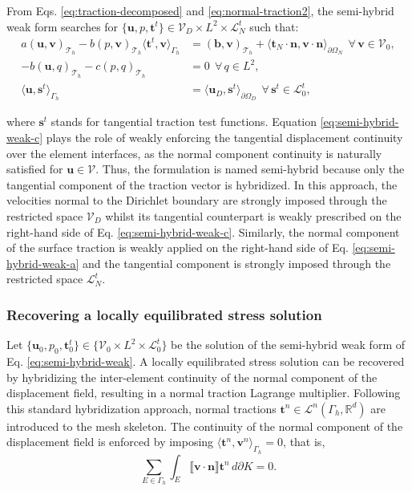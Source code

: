 \documentclass[english,11pt,3p,number,sort&compress]{elsarticle}
\newcommand{\jump}[1]
{
	\llbracket #1 \rrbracket
}
\begin{document}
From Eqs. \eqref{eq:traction-decomposed} and \eqref{eq:normal-traction2}, the semi-hybrid weak form searches for $\{\bm{u},p,\bm{t}^t\} \in \mathcal{V}_D \times L^2 \times \mathcal{L}^t_N$ such that:
\begin{subequations} \label{eq:semi-hybrid-weak}
	\begin{align}
		a\left(\bm{u},\bm{v}\right)_{\mathcal{T}_h} - b\left( p, \bm{v}\right)_{\mathcal{T}_h} \langle\bm{t}^t,\bm{v}\rangle_{\Gamma_h} &= \left(\bm{b},\bm{v}\right)_{\mathcal{T}_h} + \langle\bm{t}_N\cdot\bm{n},\bm{v}\cdot\bm{n}\rangle_{\partial\Omega_N} ~~\forall\, \bm{v} \in \mathcal{V}_0,\label{eq:semi-hybrid-weak-a}\\ 
		-b\left(\bm{u}, q\right)_{\mathcal{T}_h} - c\left(p,q \right)_{\mathcal{T}_h} &= 0 ~~\forall\, q \in L^2, \label{eq:semi-hybrid-weak-b}\\
		\langle\bm{u},\bm{s}^t\rangle_{\Gamma_h} &= \langle\bm{u}_D,\bm{s}^t\rangle_{\partial\Omega_D} ~~\forall\, \bm{s}^t \in \mathcal{L}^t_0, \label{eq:semi-hybrid-weak-c}
	\end{align}
\end{subequations}

\noindent where $\bm{s}^t$ stands for tangential traction test functions. Equation \eqref{eq:semi-hybrid-weak-c} plays the role of weakly enforcing the tangential displacement continuity over the element interfaces, as the normal component continuity is naturally satisfied for $\bm{u} \in \mathcal{V}$. Thus, the formulation is named semi-hybrid because only the tangential component of the traction vector is hybridized. In this approach, the velocities normal to the Dirichlet boundary are strongly imposed through the restricted space $\mathcal{V}_D$ whilst its tangential counterpart is weakly prescribed on the right-hand side of Eq. \eqref{eq:semi-hybrid-weak-c}. Similarly, the normal component of the surface traction is weakly applied on the right-hand side of Eq. \eqref{eq:semi-hybrid-weak-a} and the tangential component is strongly imposed through the restricted space $\mathcal{L}^t_N$.

\subsubsection{Recovering a locally equilibrated stress solution} \label{sec:local-stress}

Let $\{\bm{u}_0,p_0,\bm{t}^t_0 \} \in \{\mathcal{V}_0 \times L^2 \times \mathcal{L}^t_0 \}$ be the solution of the semi-hybrid weak form of Eq. \eqref{eq:semi-hybrid-weak}. A locally equilibrated stress solution can be recovered by hybridizing the inter-element continuity of the normal component of the displacement field, resulting in a normal traction Lagrange multiplier. Following this standard hybridization approach, normal tractions $\bm{t}^n \in \mathcal{L}^n(\Gamma_h,\mathbb{R}^d)$ are introduced to the mesh skeleton. The continuity of the normal component of the displacement field is enforced by imposing $\langle\bm{t}^n,\bm{v}^n\rangle_{\Gamma_h} = 0$, that is,
\begin{equation*}
	\sum_{E \in \Gamma_h} \int_{E} \jump{\bm{v}\cdot\bm{n}} \bm{t}^n \,d\partial K = 0 .
\end{equation*}
\end{document}
